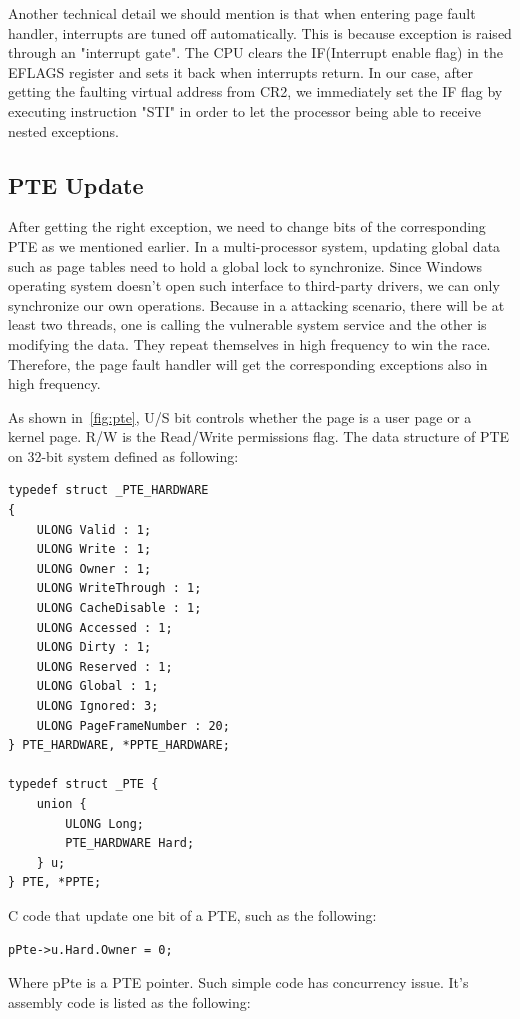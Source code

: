 Another technical detail we should mention is that when entering page fault handler, interrupts are tuned off automatically. This is because exception is raised through an "interrupt gate". The CPU clears the IF(Interrupt enable flag) in the EFLAGS register and sets it back when interrupts return. In our case, after getting the faulting virtual address from CR2, we immediately set the IF flag by executing instruction "STI" in order to let the processor being able to receive nested exceptions.

\subsection{PTE Update}

After getting the right exception, we need to change bits of the corresponding PTE as we mentioned earlier. In a multi-processor system, updating global data such as page tables need to hold a global lock to synchronize. Since Windows operating system doesn't open such interface to third-party drivers, we can only synchronize our own operations. Because in a attacking scenario, there will be at least two threads, one is calling the vulnerable system service and the other is modifying the data. They repeat themselves in high frequency to win the race. Therefore, the page fault handler will get the corresponding exceptions also in high frequency. 

As shown in~\autoref{fig:pte}, U/S bit controls whether the page is a user page or a kernel page. R/W is the Read/Write permissions flag. The data structure of PTE on 32-bit system defined as following:
\begin{lstlisting}[basicstyle=\small] 
typedef struct _PTE_HARDWARE
{
	ULONG Valid : 1;
	ULONG Write : 1;
	ULONG Owner : 1;
	ULONG WriteThrough : 1;
	ULONG CacheDisable : 1;
	ULONG Accessed : 1;
	ULONG Dirty : 1;
	ULONG Reserved : 1;
	ULONG Global : 1;
	ULONG Ignored: 3;
	ULONG PageFrameNumber : 20;
} PTE_HARDWARE, *PPTE_HARDWARE;

typedef struct _PTE {
	union {
		ULONG Long;
		PTE_HARDWARE Hard;
	} u;
} PTE, *PPTE;
\end{lstlisting}


C code that update one bit of a PTE, such as the following:

\begin{lstlisting}[basicstyle=\small] 
pPte->u.Hard.Owner = 0;
\end{lstlisting}

Where pPte is a PTE pointer. Such simple code has concurrency issue. It's assembly code is listed as the following:

